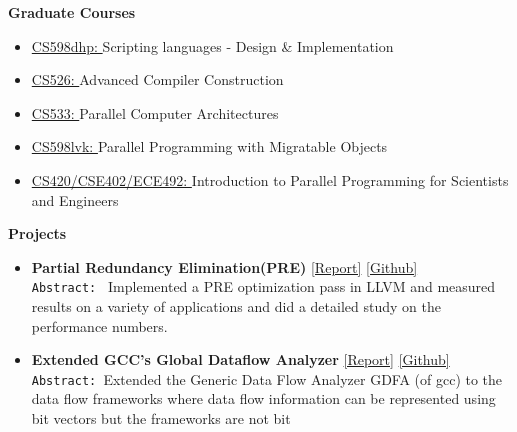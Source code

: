 \documentclass[9pt]{article}
\newenvironment{changemargin}[2]{%
  \begin{list}{}{%
    \setlength{\topsep}{0pt}%
    \setlength{\leftmargin}{#1}%
    \setlength{\rightmargin}{#2}%
    \setlength{\listparindent}{\parindent}%
    \setlength{\itemindent}{\parindent}%
    \setlength{\parsep}{\parskip}%
  }%
  \item[]}{\end{list}
}
\newenvironment{body} {
	\vspace*{-16pt}
	\begin{changemargin}{-0.25in}{-0.5in}
  }	
	{\end{changemargin}
}
\begin{document}
\begin{body}
	\vspace{14pt}
	\textbf{Graduate Courses }{} \hfill \\
	\begin{itemize} \itemsep -0pt
          \item \href{http://polaris.cs.illinois.edu/CS598/}{CS598dhp: }Scripting languages -  Design \& Implementation
          \item \href{https://cs.illinois.edu/courses/profile/CS526}{CS526: }Advanced Compiler Construction
          \item \href{https://courses.engr.illinois.edu/cs533/}{CS533: }Parallel Computer Architectures
          \item \href{https://wiki.cites.illinois.edu/wiki/display/cs598lvk/Home}{CS598lvk: }Parallel Programming with Migratable Objects
          \item  \href{https://cs.illinois.edu/courses/profile/CS420}{CS420/CSE402/ECE492: }
                                            Introduction to Parallel Programming for Scientists and Engineers
	\end{itemize}
 \medskip
	\textbf{Projects}{} \hfill  \\
	\begin{itemize} \itemsep 3pt
           \item \textbf{Partial Redundancy Elimination(PRE)} 
           \href{http://web.engr.illinois.edu/~sdasgup3/Document/report_cs526.pdf}{[Report]} 
           \href{https://github.com/sdasgup3/partial-redundancy-elimination}{[Github]} \\
                                  \texttt{Abstract: } Implemented a PRE
                                  optimization pass in LLVM and measured results
                                  on a variety of applications and did a detailed 
                                  study on the performance numbers. 
           \item \textbf{Extended GCC's Global Dataflow Analyzer} 
           \href{http://web.engr.illinois.edu/~sdasgup3/Document/report_gdfa.pdf}{[Report]} 
           \href{https://github.com/sdasgup3/non-separable-global-dataflow-framework}{[Github]} \\
                                \texttt{Abstract: }Extended the Generic Data Flow Analyzer
                                GDFA (of gcc) to the data flow frameworks where
                                data flow information can be represented using
                                bit vectors but the frameworks are not bit

\end{itemize}
\end{body}
\end{document}
